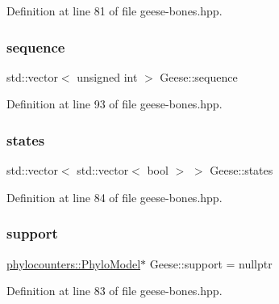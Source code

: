 Definition at line 81 of file geese-\/bones.\+hpp.

\mbox{\label{class_geese_ab815e9b33ce2cfb5757f86083f357152}} 
\subsubsection{\texorpdfstring{sequence}{sequence}}
{\footnotesize\ttfamily std\+::vector$<$ unsigned int $>$ Geese\+::sequence}



Definition at line 93 of file geese-\/bones.\+hpp.

\mbox{\label{class_geese_a84bddd2c7e0221b4ec0e1217575584b4}} 
\subsubsection{\texorpdfstring{states}{states}}
{\footnotesize\ttfamily std\+::vector$<$ std\+::vector$<$ bool $>$ $>$ Geese\+::states}



Definition at line 84 of file geese-\/bones.\+hpp.

\mbox{\label{class_geese_a71f91e3f8bea1c285c4cf1f3b84f26de}} 
\subsubsection{\texorpdfstring{support}{support}}
{\footnotesize\ttfamily \hyperlink{namespacebarry_1_1counters_1_1phylo_ad32b4186e3bab93119df225fddc3c609}{phylocounters\+::\+Phylo\+Model}$\ast$ Geese\+::support = nullptr}



Definition at line 83 of file geese-\/bones.\+hpp.




